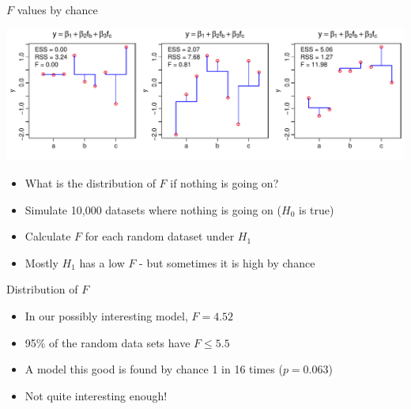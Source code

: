 \documentclass[xcolor=x11names,compress]{beamer}
\renewcommand{\(}{\begin{columns}}
\renewcommand{\)}{\end{columns}}
\newcommand{\<}[1]{\begin{column}{#1}}
\renewcommand{\>}{\end{column}}
\begin{document}
\begin{frame}{$F$ values by chance}

\includegraphics[width=\textwidth]{F_extremes.pdf}

\begin{itemize}
\item What is the distribution of $F$ if nothing is going on?
\item Simulate 10,000 datasets where nothing is going on ($H_0$ is true)
\item Calculate $F$ for each random dataset under $H_1$
\item Mostly $H_1$ has a low $F$ - but sometimes it is high by chance 
\end{itemize}

\end{frame}


\begin{frame}{Distribution of $F$}


\centerline{}

\begin{itemize}
\item In our possibly interesting model, $F=4.52$
\item<2> 95\% of the random data sets have $F\le 5.5$
\item<2> A model this good is found by chance 1 in 16 times ($p=0.063$)
\item<2> Not quite interesting enough!
\end{itemize}

\end{frame}
\end{document}
